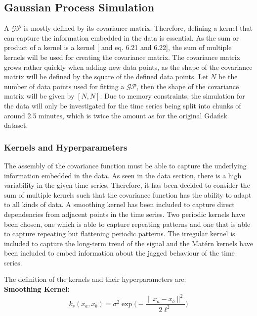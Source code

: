 \documentclass[11pt]{scrartcl}
\begin{document}
\FloatBarrier
\subsection{Gaussian Process Simulation}

A $\mathcal{GP}$ is mostly defined by its covariance matrix. Therefore, defining a kernel that can capture the information embedded in the data is essential. As the sum or product of a kernel is a kernel [\cite{shawe-taylor_cristianini_2004} and \cite{bishop} eq. 6.21 and 6.22], the sum of multiple kernels will be used for creating the covariance matrix. The covariance matrix grows rather quickly when adding new data points, as the shape of the covariance matrix will be defined by the square of the defined data points. Let $N$ be the number of data points used for fitting a $\mathcal{GP}$, then the shape of the covariance matrix will be given by $[N, N]$. Due to memory constraints, the simulation for the data will only be investigated for the time series being split into chunks of around 2.5 minutes, which is twice the amount as for the original Gdańsk dataset.

\subsubsection{Kernels and Hyperparameters}
\label{lab:kernels_and_hyperparameters}

The assembly of the covariance function must be able to capture the underlying information embedded in the data. As seen in the data section, there is a high variability in the given time series. Therefore, it has been decided to consider the sum of multiple kernels such that the covariance function has the ability to adapt to all kinds of data. A smoothing kernel has been included to capture direct dependencies from adjacent points in the time series. Two periodic kernels have been chosen, one which is able to capture repeating patterns and one that is able to capture repeating but flattening periodic patterns. The irregular kernel is included to capture the long-term trend of the signal and the Matérn kernels have been included to embed information about the jagged behaviour of the time series.

The definition of the kernels and their hyperparameters are: \\

\textbf{Smoothing Kernel:} 
\begin{equation}
	\label{eq:smoothing_kernel}
    k_s(x_a, x_b) = \sigma^2 \exp \bigg( - \frac{\|{x_a - x_b}\| ^2}{2\ell^2} \bigg)
\end{equation}
\end{document}
